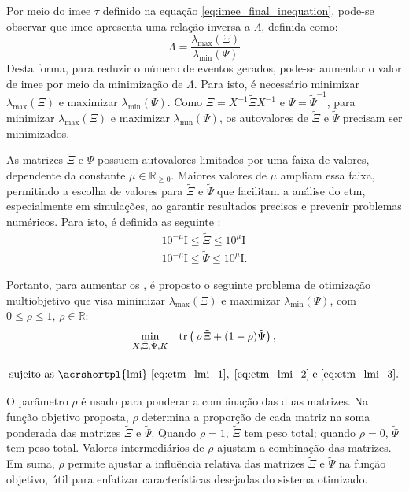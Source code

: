 Por meio do \acrshort{imee} $\tau$ definido na equação \eqref{eq:imee_final_inequation}, pode-se observar que \acrshort{imee} apresenta uma relação inversa a $\Lambda$, definida como: \begin{equation}
  \Lambda = \frac{\lambda_{\max}(\Xi)}{\lambda_{\min}(\Psi)}
\end{equation} Desta forma, para reduzir o número de eventos gerados, pode-se aumentar o valor de \acrshort{imee} por meio da minimização de $\Lambda$. Para isto, é necessário minimizar $\lambda_{\max} (\Xi)$ e maximizar $\lambda_{\min}(\Psi)$. Como $\Xi = X^{-1}\tilde{\Xi}X^{-1}$ e $\Psi = \tilde{\Psi}^{-1}$, para minimizar $\lambda_{\max} (\Xi)$ e maximizar $\lambda_{\min}(\Psi)$, os autovalores de $\tilde{\Xi}$ e $\tilde{\Psi}$ precisam ser minimizados.

As matrizes $\tilde{\Xi}$ e $\tilde{\Psi}$ possuem autovalores limitados por uma faixa de valores, dependente da constante $\mu \in \mathbb{R}_{\geq 0}$. Maiores valores de $\mu$ ampliam essa faixa, permitindo a escolha de valores para $\tilde{\Xi}$ e $\tilde{\Psi}$ que facilitam a análise do \acrshort{etm}, especialmente em simulações, ao garantir resultados precisos e prevenir problemas numéricos. Para isto, é definida as seguinte : \begin{gather}
  10^{-\mu} \mathrm{I} \leq \tilde{\Xi} \leq 10^{\mu} \mathrm{I} \label{eq:etm_lmi_2}\\
  10^{-\mu} \mathrm{I} \leq \tilde{\Psi} \leq 10^{\mu} \mathrm{I} \label{eq:etm_lmi_3}.
\end{gather}

Portanto, para aumentar os , é proposto o seguinte problema de otimização multiobjetivo que visa minimizar $\lambda_{\max} (\Xi)$ e maximizar $\lambda_{\min}(\Psi)$, com $0 \leq \rho \leq 1, \, \rho \in \mathbb{R}$: \begin{gather}\underset{X, \tilde{\Xi}, \tilde{\Psi}, \tilde{K}}\min \quad \mathrm{tr}\left(\,\rho \, \tilde{\Xi} + (1 - \rho)\tilde{\Psi}\right), \\[12pt] \textrm{sujeito as \acrshortpl{lmi} } \eqref{eq:etm_lmi_1}, \hspace{0.1cm} \eqref{eq:etm_lmi_2} \hspace{0.1cm} \mathrm{e} \hspace{0.1cm} \eqref{eq:etm_lmi_3}. \notag \label{eq:optimization_problem}\end{gather} 

O parâmetro $\rho$ é usado para ponderar a combinação das duas matrizes. Na função objetivo proposta, $\rho$ determina a proporção de cada matriz na soma ponderada das matrizes $\tilde{\Xi}$ e $\tilde{\Psi}$. Quando $\rho = 1$, $\tilde{\Xi}$ tem peso total; quando $\rho = 0$, $\tilde{\Psi}$ tem peso total. Valores intermediários de $\rho$ ajustam a combinação das matrizes. Em suma, $\rho$ permite ajustar a influência relativa das matrizes $\tilde{\Xi}$ e $\tilde{\Psi}$ na função objetivo, útil para enfatizar características desejadas do sistema otimizado.

